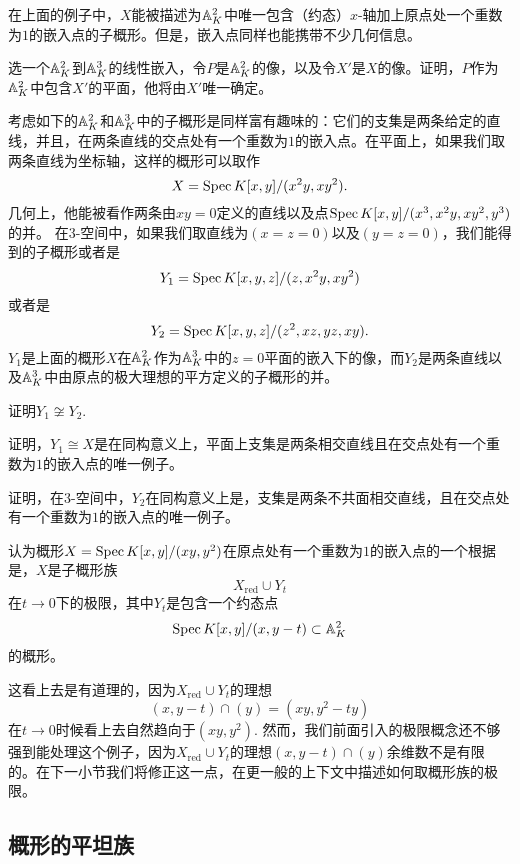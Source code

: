 在上面的例子中，$X$能被描述为$\mathbb{A}_K^2$中唯一包含（约态）$x$-轴加上原点处一个重数为$1$的嵌入点的子概形。但是，嵌入点同样也能携带不少几何信息。

\begin{exe}
	选一个$\mathbb{A}_K^2$到$\mathbb{A}^3_K$的线性嵌入，令$P$是$\mathbb{A}_K^2$的像，以及令$X'$是$X$的像。证明，$P$作为$\mathbb{A}_K^2$中包含$X'$的平面，他将由$X'$唯一确定。
\end{exe}

考虑如下的$\mathbb{A}_K^2$和$\mathbb{A}_K^3$中的子概形是同样富有趣味的：它们的支集是两条给定的直线，并且，在两条直线的交点处有一个重数为$1$的嵌入点。在平面上，如果我们取两条直线为坐标轴，这样的概形可以取作
\[
	X=\operatorname{Spec} K[x,y]/(x^2y,xy^2).
\]
几何上，他能被看作两条由$xy=0$定义的直线以及点$\operatorname{Spec} K[x,y]/(x^3,x^2y,xy^2,y^3)$的并。 在$3$\hyp 空间中，如果我们取直线为$(x=z=0)$以及$(y=z=0)$，我们能得到的子概形或者是
\[
	Y_1=\operatorname{Spec} K[x,y,z]/(z,x^2y,xy^2)
\]
或者是
\[
	Y_2=\operatorname{Spec} K[x,y,z]/(z^2,xz,yz,xy).
\]
$Y_1$是上面的概形$X$在$\mathbb{A}_K^2$作为$\mathbb{A}_K^3$中的$z=0$平面的嵌入下的像，而$Y_2$是两条直线以及$\mathbb{A}_K^3$中由原点的极大理想的平方定义的子概形的并。

\begin{exe}
	证明$Y_1\not\cong Y_2$.
	\begin{compactenum}[(a)]
		\item 证明，$Y_1\cong X$是在同构意义上，平面上支集是两条相交直线且在交点处有一个重数为$1$的嵌入点的唯一例子。
		\item 证明，在$3$\hyp 空间中，$Y_2$在同构意义上是，支集是两条不共面相交直线，且在交点处有一个重数为$1$的嵌入点的唯一例子。
	\end{compactenum}
\end{exe}

认为概形$X=\operatorname{Spec} K[x,y]/(xy,y^2)$在原点处有一个重数为$1$的嵌入点的一个根据是，$X$是子概形族
\[
	X_{\text{red}}\cup Y_t
\]
在$t\to 0$下的极限，其中$Y_t$是包含一个约态点
\[
	\operatorname{Spec} K[x,y]/(x,y-t)\subset \mathbb{A}_K^2
\]
的概形。

这看上去是有道理的，因为$X_{\text{red}}\cup Y_t$的理想
\[
	(x,y-t)\cap (y)=(xy,y^2-ty)
\]
在$t\to 0$时候看上去自然趋向于$(xy,y^2)$. 然而，我们前面引入的极限概念还不够强到能处理这个例子，因为$X_{\text{red}}\cup Y_t$的理想$(x,y-t)\cap(y)$余维数不是有限的。在下一小节我们将修正这一点，在更一般的上下文中描述如何取概形族的极限。

\subsection{概形的平坦族}\label{s:2.3.4}

